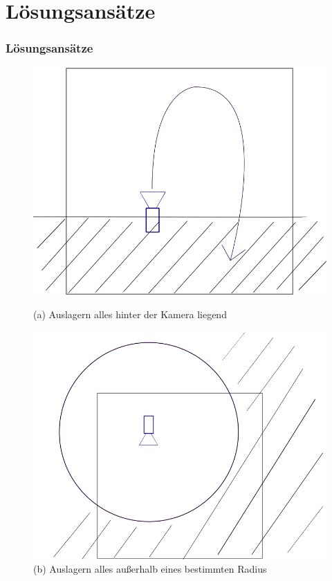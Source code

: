 \documentclass[presentation]{beamer}
\begin{document}
\section{Lösungsansätze}
\begin{frame}
	\frametitle{Lösungsansätze}
	\begin{figure} 
		\centering
		\begin{minipage}{.5\textwidth}
			\centering
			\includegraphics[width=0.90\linewidth]{figures/introduction/mot1.png}
			\caption{(a) Auslagern alles hinter der Kamera liegend}
			\label{fig:sub1}
		\end{minipage}%
		\begin{minipage}{.5\textwidth} 
			\centering
			\includegraphics[width=0.90\linewidth]{figures/introduction/mot2.png}
			\caption{(b) Auslagern alles außerhalb eines bestimmten Radius}
			\label{fig:sub2}
		\end{minipage}
	\label{fig:test} 
\end{figure}
\end{frame}
\end{document}

